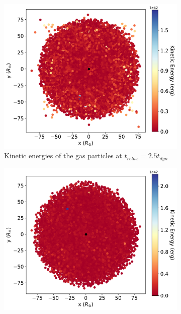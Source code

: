 \begin{figure}[H]
    \centering
    \begin{subfigure}[b]{0.49\textwidth}
        \centering
        \includegraphics[width=\textwidth]{Thesis/graphs/tertiary_kin_energy_relaxed_2_5_tdyn.pdf}   
        \caption{Kinetic energies of the gas particles at  $t_{relax} = 2.5t_{dyn}$}%
    \end{subfigure}
    \hfill
    \begin{subfigure}[b]{0.49\textwidth}  
        \centering 
        \includegraphics[width=\textwidth]{Thesis/graphs/tertiary_kin_energy_relaxed_5_tdyn.pdf}

\end{subfigure}
\end{figure}

